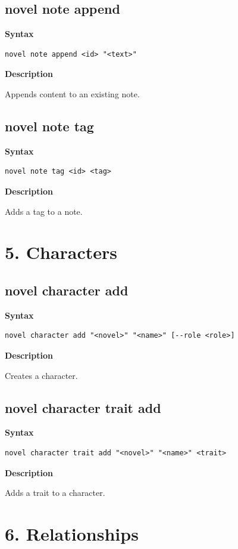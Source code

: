 \documentclass[11pt]{article}
\begin{document}
\subsection{novel note append}

\textbf{Syntax}
\begin{verbatim}
novel note append <id> "<text>"
\end{verbatim}

\textbf{Description}

Appends content to an existing note.

\subsection{novel note tag}

\textbf{Syntax}
\begin{verbatim}
novel note tag <id> <tag>
\end{verbatim}

\textbf{Description}

Adds a tag to a note.

\section{5. Characters}

\subsection{novel character add}

\textbf{Syntax}
\begin{verbatim}
novel character add "<novel>" "<name>" [--role <role>]
\end{verbatim}

\textbf{Description}

Creates a character.

\subsection{novel character trait add}

\textbf{Syntax}
\begin{verbatim}
novel character trait add "<novel>" "<name>" <trait>
\end{verbatim}

\textbf{Description}

Adds a trait to a character.

\section{6. Relationships}
\end{document}
